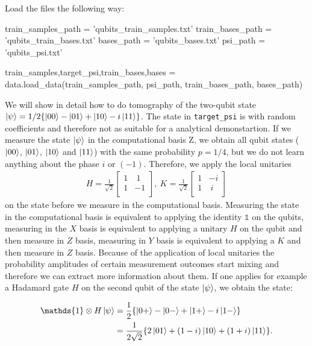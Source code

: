 \documentclass[submission, Phys]{SciPost}
\begin{document}
Load the files the following way:

\begin{python}
train_samples_path = 'qubits_train_samples.txt'
train_bases_path   = 'qubits_train_bases.txt'
bases_path         = 'qubits_bases.txt'
psi_path           = 'qubits_psi.txt'

train_samples,target_psi,train_bases,bases = data.load_data(train_samples_path, psi_path, train_bases_path, bases_path)
\end{python}


We will show in detail how to do tomography of the two-qubit state
$\ket{\psi} = 1/2 \{ \ket{00} - \ket{01} + \ket{10} - i \ket{11} \}$.
The state in \verb|target_psi| is with random coefficients and therefore not as suitable for a analytical demonstartion.
If we measure the state $\ket{\psi}$ in the computational basis Z, we obtain all qubit states ($\ket{00}$, $\ket{01}$, $\ket{10}$ and $\ket{11}$) with the same probability $p = 1/4$, but we do not learn anything about the phase $i$ or $(-1)$.
Therefore, we apply the local unitaries
\begin{align}
	H = \frac{1}{\sqrt{2}}
	\begin{bmatrix}
		1 & ~1 \\
		1 & -1 \\
	\end{bmatrix},~
	K = \frac{1}{\sqrt{2}}
	\begin{bmatrix}
		1 & -i \\
		1 & ~i \\
	\end{bmatrix}
\end{align}
on the state before we measure in the computational basis. Measuring the state in the computational basis is equivalent to applying the identity $\mathds{1}$ on the qubits, measuring in the $X$ basis is equivalent to applying a unitary $H$ on the qubit and then measure in $Z$ basis, measuring in $Y$ basis is equivalent to applying a $K$ and then measure in $Z$ basis. Because of the application of local unitaries the probability amplitudes of certain measurement outcomes start mixing and therefore we can extract more information about them. If one applies for example a Hadamard gate $H$ on the second qubit of the state $\ket{\psi}$, we obtain the state:

\begin{align}
	\mathds{1} \otimes H \ket{\psi} & = \frac{1}{2} \{ \ket{0+} - \ket{0-} + \ket{1+} - i \ket{1-} \}          \\
	                                & = \frac{1}{2 \sqrt{2}} \{ 2 \ket{01} + (1-i)\ket{10} + (1+i)\ket{11} \}.
\end{align}
\end{document}
